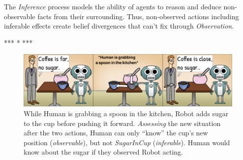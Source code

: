 \documentclass[letterpaper]{article} %
\begin{document}

The \textit{Inference} process models the ability of agents to reason and deduce non-observable facts from their surrounding. Thus, non-observed actions including inferable effects create belief divergences that can't fix through \textit{Observation}. 

*** * *** %

\begin{figure}[t!]
    \centering
    \includegraphics[width=1.0\linewidth]{figures/cartoon_obs(2).png}
    \caption{
    While Human is grabbing a spoon in the kitchen, Robot adds sugar to the cup before pushing it forward. \textit{Assessing} the new situation after the two actions, Human can only ``know'' the cup's new position (\textit{observable}), but not \textit{SugarInCup} (\textit{inferable}). Human would know about the sugar if they observed Robot acting.
    }
    \label{fig:cartoon}
\end{figure}

\end{document}
